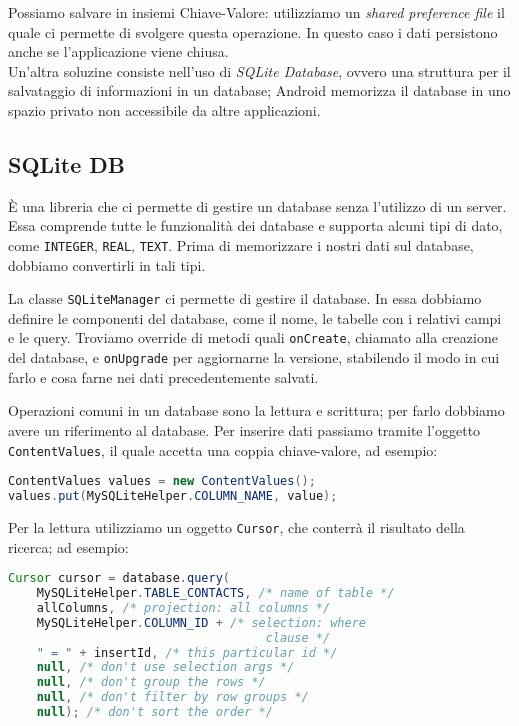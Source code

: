 Possiamo salvare in insiemi Chiave-Valore: utilizziamo un \textit{shared
preference file} il quale ci permette di svolgere questa operazione. In questo
caso i dati persistono anche se l'applicazione viene chiusa. \\
Un'altra soluzine consiste nell'uso di \textit{SQLite Database}, ovvero una
struttura per il salvataggio di informazioni in un database; Android memorizza
il database in uno spazio privato non accessibile da altre applicazioni.

\subsection{SQLite DB}

\`E una libreria che ci permette di gestire un database senza l'utilizzo di un
server. Essa comprende tutte le funzionalità dei database e supporta alcuni
tipi di dato, come \texttt{INTEGER}, \texttt{REAL}, \texttt{TEXT}. 
Prima di memorizzare i nostri dati sul database, dobbiamo convertirli in tali tipi.

La classe \texttt{SQLiteManager} ci permette di gestire il database. In essa
dobbiamo definire le componenti del database, come il nome, le tabelle con i
relativi campi e le query. Troviamo override di metodi quali \texttt{onCreate},
chiamato alla creazione del database, e \texttt{onUpgrade} per aggiornarne la
versione, stabilendo il modo in cui farlo e cosa farne nei dati precedentemente
salvati.

Operazioni comuni in un database sono la lettura e scrittura; per farlo dobbiamo
avere un riferimento al database. Per inserire dati passiamo tramite l'oggetto
\texttt{ContentValues}, il quale accetta una coppia chiave-valore, ad esempio:

\begin{lstlisting}[language=Java]
ContentValues values = new ContentValues();
values.put(MySQLiteHelper.COLUMN_NAME, value);
\end{lstlisting}

Per la lettura utilizziamo un oggetto \texttt{Cursor}, che conterrà il risultato
della ricerca; ad esempio:

\begin{lstlisting}[language=Java]
Cursor cursor = database.query(
    MySQLiteHelper.TABLE_CONTACTS, /* name of table */
    allColumns, /* projection: all columns */
    MySQLiteHelper.COLUMN_ID + /* selection: where
                                    clause */
    " = " + insertId, /* this particular id */
    null, /* don't use selection args */
    null, /* don't group the rows */
    null, /* don't filter by row groups */
    null); /* don't sort the order */
\end{lstlisting}

